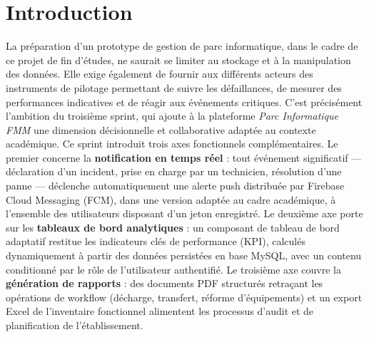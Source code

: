 \vspace{1cm}
\label{chap:sprint3}
\setcounter{chapter}{7}
\setcounter{section}{0}

\localtableofcontents
\newpage
\pagebreak

\section*{Introduction}

La préparation d'un prototype de gestion de parc informatique, dans le cadre de ce projet de fin d’études, ne saurait se limiter au stockage et à la manipulation des données. Elle exige également de fournir aux différents acteurs des instruments de pilotage permettant de suivre les défaillances, de mesurer des performances indicatives et de réagir aux événements critiques. C'est précisément l'ambition du troisième sprint, qui ajoute à la plateforme \textit{Parc Informatique FMM} une dimension décisionnelle et collaborative adaptée au contexte académique. Ce sprint introduit trois axes fonctionnels complémentaires. Le premier concerne la \textbf{notification en temps réel} : tout événement significatif — déclaration d'un incident, prise en charge par un technicien, résolution d'une panne — déclenche automatiquement une alerte push distribuée par Firebase Cloud Messaging (FCM), dans une version adaptée au cadre académique, à l'ensemble des utilisateurs disposant d'un jeton enregistré. Le deuxième axe porte sur les \textbf{tableaux de bord analytiques} : un composant de tableau de bord adaptatif restitue les indicateurs clés de performance (KPI), calculés dynamiquement à partir des données persistées en base MySQL, avec un contenu conditionné par le rôle de l'utilisateur authentifié. Le troisième axe couvre la \textbf{génération de rapports} : des documents PDF structurés retraçant les opérations de workflow (décharge, transfert, réforme d'équipements) et un export Excel de l'inventaire fonctionnel alimentent les processus d'audit et de planification de l'établissement.


